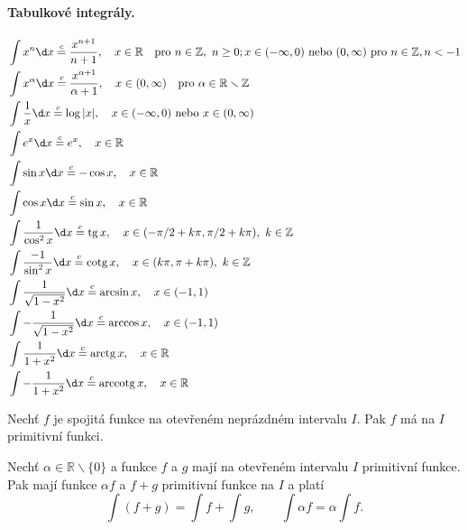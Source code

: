 \paragraph{Tabulkové integrály.}
\begin{align*}
&\int x^n \d x \stackrel{c}{=} \frac{x^{n+1}}{n+1}, \quad x \in \mathbb R  \quad \text{pro } n \in \mathbb{Z},\ n \ge 0;x \in (-\infty,0)\text{ nebo } (0,\infty)\text{ pro }n \in \mathbb Z , n < -1\\
&\int x^\alpha \d x \stackrel{c}{=} \frac{x^{\alpha+1}}{\alpha+1}, \quad x \in (0,\infty) \quad \text{pro } \alpha \in \mathbb{R} \smallsetminus \mathbb{Z}\\
&\int \frac{1}{x}\d x \stackrel{c}{=} \log |x|, \quad x \in (-\infty,0)\text{ nebo }x \in (0,\infty) \\
&\int e^x \d x \stackrel{c}{=} e^x, \quad x \in \mathbb R \\
&\int \sin x \d x \stackrel{c}{=} -\cos x,\quad x \in \mathbb R \\
&\int \cos x \d x \stackrel{c}{=} \sin x,\quad x \in \mathbb R\\
&\int \frac{1}{\cos^2 x}\d x \stackrel{c}{=} \tg x, \quad x \in (-\pi/2+k\pi, \pi/2+k\pi),\ k \in \mathbb Z \\
&\int \frac{-1}{\sin^2 x}\d x \stackrel{c}{=} \cotg x, \quad x \in (k\pi, \pi+k\pi),\ k \in \mathbb Z \\
&\int \frac{1}{\sqrt{1-x^2}}\d x \stackrel{c}{=} \arcsin x, \quad x \in (-1,1)\\
&\int -\frac{1}{\sqrt{1-x^2}}\d x \stackrel{c}{=} \arccos x,\quad x \in (-1,1)\\
&\int \frac{1}{1+x^2}\d x \stackrel{c}{=} \arctg x,\quad x \in \mathbb R\\
&\int -\frac{1}{1+x^2}\d x \stackrel{c}{=} \arccotg x,\quad x \in \mathbb R
\end{align*}

\begin{veta}\label{veta8.2}
Nechť $f$ je spojitá funkce na otevřeném neprázdném intervalu $I$. Pak $f$ má na $I$ primitivní funkci.
\end{veta}

\begin{veta}\label{veta8.3}
Nechť $\alpha \in \mathbb{R} \smallsetminus \{0\}$ a funkce $f$ a $g$ mají na otevřeném intervalu $I$ primitivní funkce. Pak mají funkce $\alpha f$ a $f+g$ primitivní funkce na $I$ a platí
\[
\int (f+g) = \int f + \int g,\qquad
\int \alpha f = \alpha \int f.
\]
\end{veta}

